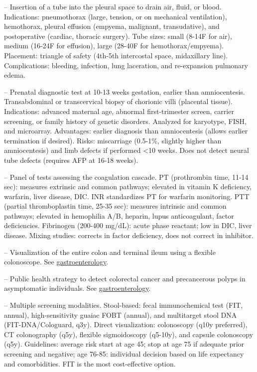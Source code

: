 -- Insertion of a tube into the pleural space to drain air, fluid, or blood. Indications: pneumothorax (large, tension, or on mechanical ventilation), hemothorax, pleural effusion (empyema, malignant, transudative), and postoperative (cardiac, thoracic surgery). Tube sizes: small (8-14F for air), medium (16-24F for effusion), large (28-40F for hemothorax/empyema). Placement: triangle of safety (4th-5th intercostal space, midaxillary line). Complications: bleeding, infection, lung laceration, and re-expansion pulmonary edema.

-- Prenatal diagnostic test at 10-13 weeks gestation, earlier than amniocentesis. Transabdominal or transcervical biopsy of chorionic villi (placental tissue). Indications: advanced maternal age, abnormal first-trimester screen, carrier screening, or family history of genetic disorders. Analyzed for karyotype, FISH, and microarray. Advantages: earlier diagnosis than amniocentesis (allows earlier termination if desired). Risks: miscarriage (0.5-1\%, slightly higher than amniocentesis) and limb defects if performed <10 weeks. Does not detect neural tube defects (requires AFP at 16-18 weeks).

-- Panel of tests assessing the coagulation cascade. PT (prothrombin time, 11-14 sec): measures extrinsic and common pathways; elevated in vitamin K deficiency, warfarin, liver disease, DIC. INR standardizes PT for warfarin monitoring. PTT (partial thromboplastin time, 25-35 sec): measures intrinsic and common pathways; elevated in hemophilia A/B, heparin, lupus anticoagulant, factor deficiencies. Fibrinogen (200-400 mg/dL): acute phase reactant; low in DIC, liver disease. Mixing studies: corrects in factor deficiency, does not correct in inhibitor.

-- Visualization of the entire colon and terminal ileum using a flexible colonoscope. See \hyperlink{Gastroenterology}{gastroenterology}.

-- Public health strategy to detect colorectal cancer and precancerous polyps in asymptomatic individuals. See \hyperlink{Gastroenterology}{gastroenterology}.

-- Multiple screening modalities. Stool-based: fecal immunochemical test (FIT, annual), high-sensitivity guaiac FOBT (annual), and multitarget stool DNA (FIT-DNA/Cologuard, q3y). Direct visualization: colonoscopy (q10y preferred), CT colonography (q5y), flexible sigmoidoscopy (q5-10y), and capsule colonoscopy (q5y). Guidelines: average risk start at age 45; stop at age 75 if adequate prior screening and negative; age 76-85: individual decision based on life expectancy and comorbidities. FIT is the most cost-effective option.

